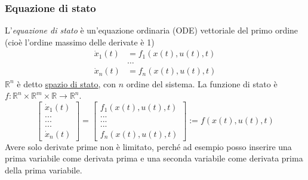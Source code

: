 \documentclass{article}
\numberwithin{equation}{subsection}
\begin{document}
\subsubsection{Equazione di stato}
L'\textit{equazione di stato} è un'equazione ordinaria (ODE) vettoriale del primo ordine (cioè l'ordine massimo delle derivate è 1)
\begin{align*}
    \dot x_1(t) &= f_1 \left(x(t), u(t), t\right)\\
    &\dots\\
    \dot x_n (t) &= f_n \left(x(t), u(t), t\right)
\end{align*}
$\mathbb{R}^n$ è detto \underline{spazio di stato}, con $n$ ordine del sistema. La funzione di stato è $f: \mathbb{R}^n \times \mathbb{R}^m \times \mathbb{R} \rightarrow \mathbb{R}^n$.
\begin{equation}
    \begin{bmatrix}
        \dot x_1(t)\\
        ...\\
        ...\\
        ...\\
        \dot x_n(t)
    \end{bmatrix} 
    =
    \begin{bmatrix}
        f_1\left(x(t),u(t),t\right)\\
        ...\\
        ...\\
        ...\\
        f_n\left(x(t),u(t),t\right)
    \end{bmatrix}
    := f\left(x(t),u(t),t\right)
\end{equation}
Avere solo derivate prime non è limitato, perché ad esempio posso inserire una prima variabile come derivata prima e una seconda variabile come derivata prima della prima variabile.
\end{document}
